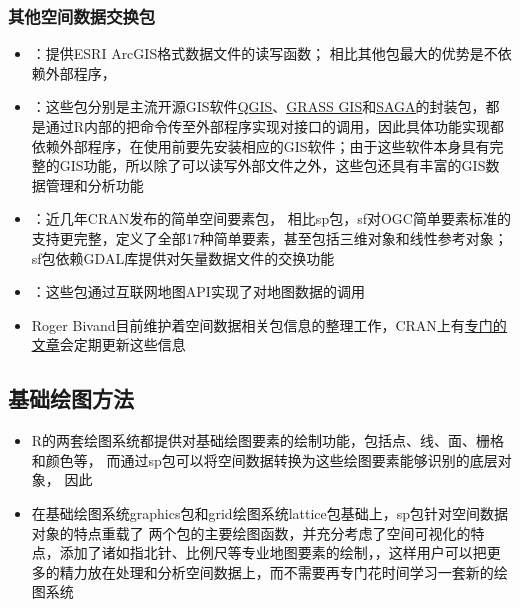\subsubsection{其他空间数据交换包}
\begin{frame}[t]{\subsecname}{\subsubsecname}
\begin{itemize} 
\item {}：提供ESRI ArcGIS格式数据文件的读写函数；
相比其他包最大的优势是不依赖外部程序，
\item {}：这些包分别是主流开源GIS软件\href{https://www.qgis.org/}{\uline{QGIS}}、\href{https://grass.osgeo.org/}{\uline{GRASS GIS}}和\href{http://www.saga-gis.org/}{\uline{SAGA}}的封装包，都是通过R内部的把命令传至外部程序实现对接口的调用，因此具体功能实现都依赖外部程序，在使用前要先安装相应的GIS软件；由于这些软件本身具有完整的GIS功能，所以除了可以读写外部文件之外，这些包还具有丰富的GIS数据管理和分析功能
\item {}：近几年CRAN发布的简单空间要素包，
相比sp包，sf对OGC简单要素标准的支持更完整，定义了全部17种简单要素，甚至包括三维对象和线性参考对象；sf包依赖GDAL库提供对矢量数据文件的交换功能
\item {}：这些包通过互联网地图API实现了对地图数据的调用
\item Roger Bivand目前维护着空间数据相关包信息的整理工作，CRAN上有\href{https://cran.r-project.org/web/views/Spatial.html}{\uline{专门的文章}}会定期更新这些信息
\end{itemize}
\end{frame}

\subsection{基础绘图方法}
\begin{frame}[t]{\subsecname}
\begin{itemize} 
\item<1-> R的两套绘图系统都提供对基础绘图要素的绘制功能，包括点、线、面、栅格和颜色等，
而通过sp包可以将空间数据转换为这些绘图要素能够识别的底层对象，
因此
\item<2-> 在基础绘图系统graphics包和grid绘图系统lattice包基础上，sp包针对空间数据对象的特点重载了
两个包的主要绘图函数，并充分考虑了空间可视化的特点，添加了诸如指北针、比例尺等专业地图要素的绘制，，这样用户可以把更多的精力放在处理和分析空间数据上，而不需要再专门花时间学习一套新的绘图系统\end{itemize}
\end{frame}

